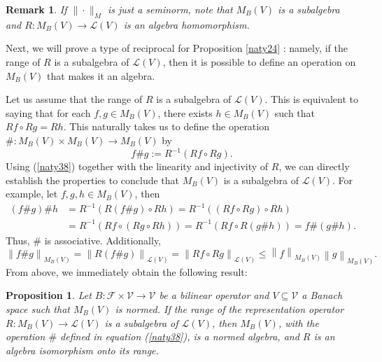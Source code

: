 \documentclass[14pt, a4paper]{article}  %
\providecommand{\pare}[1]{\left( #1\right) }
\providecommand{\norm}[1]{\left\lVert#1\right\rVert}
\newcommand{\tien}{\rightarrow}
\newcommand{\F}{\mathcal{F}}
\newcommand{\V}{\mathcal{V}}
\newtheorem{proposition}{Proposition}[section]
\newtheorem{remark}{Remark}[section]
\begin{document}
 			\begin{remark}
 		If $\|\cdot\|_M$ is just a seminorm, note that  $M_B(V)$ is a subalgebra and $R\colon M_B(V) \tien \mathcal{L}(V)$ is an algebra homomorphism. 
 	\end{remark}  
 	
	
	Next, we will prove a type of reciprocal for Proposition \ref{naty24} : namely, if the range of $R$  is a subalgebra of $\mathcal{L}\pare{V}$, then it is possible to define an operation on  $M_{B}\pare{V}$ that makes it an algebra.
	
	Let us assume that the range of $R$ is a subalgebra of 
	$\mathcal{L}\pare{V}$. This is equivalent to saying that for each $f,g\in M_{B}\pare{V}$, there exists $h\in  M_{B}\pare{V}$ such that $Rf\circ Rg=Rh.$ This naturally takes us to define the operation $\#:M_{B}\pare{V}\times M_{B}\pare{V}\tien M_{B}\pare{V}$ by  
	\begin{equation}\label{naty38}
		f\# g:=R^{-1}\pare{Rf\circ Rg}. 
	\end{equation}
	Using  (\ref{naty38}) together with the linearity and injectivity of $R$, we can directly establish the   properties to conclude that $M_{B}\pare{V}$ is a subalgebra of $\mathcal{L}\pare{V}$. For example, let  $f,g,h\in M_{B}\pare{V}$, then \begin{align*}
		\pare{f\# g}\# h&=R^{-1}\pare{R\pare{f\#g}\circ Rh}=R^{-1}\pare{\pare{Rf\circ Rg}\circ Rh}\\[.3 cm]
		&=R^{-1}\pare{Rf\circ \pare{Rg\circ Rh}}=R^{-1}\pare{Rf\circ R\pare{g\# h}}=f\#\pare{g\# h}.
	\end{align*}
	Thus, $\#$ is associative.  Additionally,
	\begin{equation}
		\norm{f\# g}_{M_{B}\pare{V}}=\norm{R\pare{f\# g}}_{\mathcal{L}\pare{V}}=\norm{Rf\circ Rg}_{\mathcal{L}\pare{V}} \leq \norm{f}_{M_{B}\pare{V}}\norm{g}_{M_{B}\pare{V}}.
	\end{equation}
	From above, we immediately obtain the following result:
	
	\begin{proposition}\label{naty39} Let  $B:\F\times \mathcal{V}\tien   \mathcal{V}$ be a bilinear operator and   $V\subseteq \V$ a Banach space such that $M_{B}\pare{V}$ is normed. If the range of the representation operator  $R:M_{B}\pare{V}\tien \mathcal{L}\pare{V}$ is a subalgebra of $\mathcal{L}\pare{V}$, then    $M_{B}\pare{V}$, with the operation  $\#$ defined in equation (\ref{naty38}),  is a normed algebra, and     $R$ is an algebra isomorphism onto its range.  
	\end{proposition}
	
\end{document}
